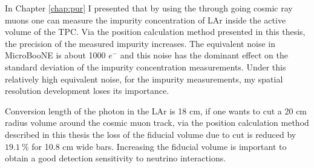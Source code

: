 \documentclass[a4paper]{article}\linespread{1.4}
\begin{document}
In Chapter \ref{chap:pur} I presented that by using the through going cosmic ray muons one can measure the impurity concentration of LAr inside the active volume of the TPC. Via the position calculation method presented in this thesis, the precision of the measured impurity increases. 
The equivalent noise in MicroBooNE is about 1000 $e^{-}$ and this noise has the dominant effect on the standard deviation of the impurity concentration measurements. Under this relatively high equivalent noise, for the impurity measurements, my spatial resolution development loses its importance.

Conversion length of the photon in the LAr is 18 cm, if one wants to cut a 20 cm radius volume around the cosmic muon track, via the position calculation method described in this thesis the loss of the fiducial volume due to cut is reduced by $19.1~\%$ for 10.8 cm wide bars. 
Increasing the fiducial volume is important to obtain a good detection sensitivity to neutrino interactions.


\clearpage
\end{document}
